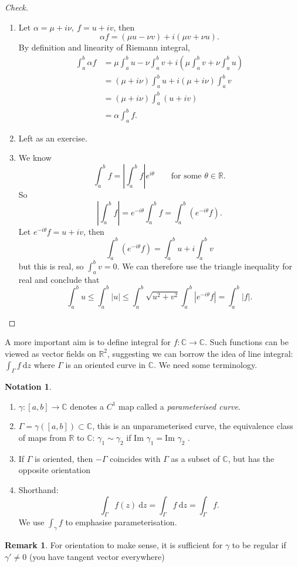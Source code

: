 \documentclass[a4paper]{article}
\theoremstyle{definition}
\newtheorem*{remark}{Remark}
\newtheorem*{notation}{Notation}
\begin{document}
\begin{proof}[Check]
\begin{enumerate}
    \item Let $\alpha = \mu + i\nu,\ f=u+iv$, then
    \[
    \alpha f = (\mu u-\nu v) + i (\mu v+\nu u).
    \]
    By definition and linearity of Riemann integral,
    \[
    \begin{aligned}
    \int_a^b \alpha f &= \mu \int_a^b u - \nu \int_a^b v + i \left( \mu \int_a^b v + \nu\int_a^b u \right) \\
    &= (\mu + i\nu ) \int_a^b u + i (\mu + i\nu ) \int_a^b v \\
    &= (\mu + i\nu ) \int_a^b (u+iv) \\
    &= \alpha \int_a^b f .
    \end{aligned}
    \]
    \item Left as an exercise.
    \item We know
    \[
    \int_a^b f = \left| \int_a^b f \right| e^{i\theta} \qquad \text{for some }\theta \in \mathbb R.
    \]
    So
    \[
    \left| \int_a^b f \right| = e^{-i\theta} \int_a^b f = \int_a^b \left(e^{-i\theta} f\right).
    \]
    Let $e^{-i\theta} f=u+iv$, then
    \[
    \int_a^b \left(e^{-i\theta} f\right) = \int_a^b u + i\int_a^b v
    \]
    but this is real, so $\int_a^b v=0.$ We can therefore use the triangle inequality for real and conclude that
    \[
    \int_a^b u \leq \int_a^b |u| \leq \int_a^b \sqrt{u^2+v^2} \int_a^b \left| e^{-i\theta} f\right| = \int_a^b |f|.
    \]
\end{enumerate}
\end{proof}

A more important aim is to define integral for $f:\mathbb C \rightarrow \mathbb C$. Such functions can be viewed as vector fields on $\mathbb R^2$, suggesting we can borrow the idea of line integral: $\displaystyle \int_\Gamma f \ \mathrm d z$ where $\Gamma$ is an oriented curve in $\mathbb C$. We need some terminology.
\begin{notation}
\begin{enumerate}
    \item $\gamma:[a,b]\rightarrow \mathbb C$ denotes a $C^1$ map called a \textit{parameterised curve}.
    \item $\Gamma = \gamma([a,b]) \subset \mathbb C$, this is an unparameterised curve, the equivalence class of maps from $\mathbb R$ to $\mathbb C$: $\gamma_1 \sim \gamma_2$ if $\text{Im } \gamma_1=\text{Im } \gamma_2$ .
    \item If $\Gamma$ is oriented, then $-\Gamma$ coincides with $\Gamma$ as a subset of $\mathbb C$, but has the opposite orientation
    \item Shorthand:
    \[
    \int_\Gamma f(z) \ \mathrm d z = \int_\Gamma f \ \mathrm d z = \int_\Gamma f .
    \]
    We use $\int_\gamma f$ to emphasise parameterisation.
\end{enumerate}
\end{notation}
\begin{remark}
For orientation to make sense, it is sufficient for $\gamma$ to be regular if $\gamma'\neq 0$ (you have tangent vector everywhere)
\end{remark}
\end{document}
